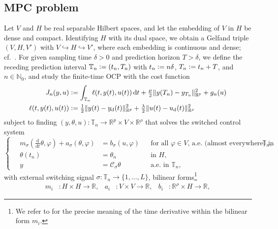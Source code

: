 \documentclass[reqno]{amsart}
\newcommand{\R}{\mathbb R}
\newcommand{\N}{\mathbb N}
\newcommand{\timeInt}{\mathbb{T}}
\newcommand{\state}{\theta}
\newcommand{\desired}[1]{#1_{\mathrm{d}}}
\newcommand{\inpVar}{u}
\newcommand{\inpVarDes}{\desired{u}}
\newcommand{\inpVarDim}{\rho}
\newcommand{\outVar}{y}
\newcommand{\outVarDes}{\desired{y}}
\newcommand{\outVarDim}{p}
\newcommand{\dt}{\,\mathrm{d}t}
\newcommand{\ddt}{\tfrac{\mathrm{d}}{\mathrm{d}t}}
\newcommand{\cOper}{\calC}
\newcommand{\switch}{\sigma}
\newcommand{\nrModes}{L}
\newcommand{\calC}{\mathcal{C}}
\newcommand{\abbr}[1]{\textsf{#1}\xspace}
\newcommand{\MPC}{\abbr{MPC}}
\newcommand{\OCP}{\abbr{OCP}}
\begin{document}
\subsection{\MPC problem}
\label{subsec:MPC}
%
Let $V$ and $H$ be real separable Hilbert spaces, and let the embedding of $V$ in $H$ be dense and compact. Identifying $H$ with its dual space, we obtain a Gelfand triple $(V,H,V')$ with $V\hookrightarrow H \hookrightarrow V'$, where each embedding is continuous and dense; cf.~\cite[Sec.~23.4]{Zei90}. For given sampling time $\delta>0$ and prediction horizon $T>\delta$, we define the receding prediction interval $\timeInt_n \vcentcolon= (t_n,T_n)$ with $t_n \vcentcolon= n\delta$, $T_n \vcentcolon= t_n + T$, and $n\in\N_0$, and study the finite-time \OCP with the cost function 
%
\begin{align}\label{eqn:cost:fun}
\begin{aligned}
    J_n(\outVar,\inpVar) &\vcentcolon=  \int_{\timeInt_n} \ell(t,\outVar(t), \inpVar(t)) \dt + \tfrac{\mu}{2} \|\outVar(T_n)-\outVar_{T_n}\|^2_{\R^{\outVarDim}} + g_n(\inpVar)\\
    \ell(t,{\outVar(t)},{\inpVar(t)}) &\vcentcolon= \tfrac{1}{2}\|{\outVar(t)}-\outVarDes(t)\|^2_{\R^{\outVarDim}}+ \tfrac{\lambda}{2} \|{\inpVar(t)}-\inpVarDes(t)\|^2_{\R^{\inpVarDim}}
    \end{aligned}
\end{align}
%
subject to finding $(\outVar,\state,\inpVar)\colon \timeInt_n \to \R^{\outVarDim}\times V \times \R^{\inpVarDim}$ that solves the switched control system
%
\begin{equation}
    \label{eqn:weakForm} %
    \left\{\quad
    \begin{aligned}
        m_{\switch}(\ddt \state,\varphi) + a_{\switch}(\state,\varphi) &= b_{\switch}(\inpVar,\varphi) && \text{for all $\varphi\in V$, a.e. (almost everywhere) in }\timeInt_n,\\
       \state(t_n) &= \state_{n} && \text{in } H,\\
       \outVar &= \cOper_{\switch}\state && \text{a.e. in }\timeInt_n, %
    \end{aligned}\right.
\end{equation}
%
with external switching signal $\switch\colon \timeInt_n \to \{1,\ldots,\nrModes\}$, bilinear forms\footnote{We refer to  for the precise meaning of the time derivative within the bilinear form $m_i$.}
%
\begin{align*}
    m_i&\colon H\times H\to \R, &
    a_i&\colon V\times V\to \R, &
    b_i&\colon \R^{\inpVarDim}\times H\to\R, 
\end{align*}
\end{document}
